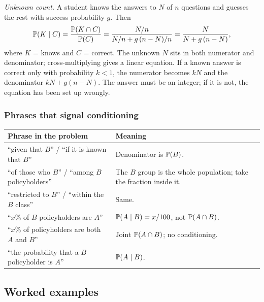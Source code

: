 \emph{Unknown count.} A student knows the answers to $N$ of $n$ questions and
guesses the rest with success probability $g$. Then
\[
\mathbb{P}(K \mid C) = \frac{\mathbb{P}(K \cap C)}{\mathbb{P}(C)}
= \frac{N/n}{N/n + g\,(n - N)/n} = \frac{N}{N + g\,(n - N)} ,
\]
where $K$ = knows and $C$ = correct. The unknown $N$ sits in both numerator and
denominator; cross-multiplying gives a linear equation. If a known answer is
correct only with probability $k < 1$, the numerator becomes $kN$ and the
denominator $kN + g(n - N)$. The answer must be an integer; if it is not, the
equation has been set up wrongly.

\subsubsection*{Phrases that signal conditioning}

\begin{center}
\begin{tabular}{@{}p{}p{}@{}}
\toprule
Phrase in the problem & Meaning \\
\midrule
``given that $B$'' / ``if it is known that $B$'' & Denominator is $\mathbb{P}(B)$. \\
``of those who $B$'' / ``among $B$ policyholders'' & The $B$ group is the whole population; take the fraction inside it. \\
``restricted to $B$'' / ``within the $B$ class'' & Same. \\
``$x$\% of $B$ policyholders are $A$'' & $\mathbb{P}(A \mid B) = x/100$, not $\mathbb{P}(A \cap B)$. \\
``$x$\% of policyholders are both $A$ and $B$'' & Joint $\mathbb{P}(A \cap B)$; no conditioning. \\
``the probability that a $B$ policyholder is $A$'' & $\mathbb{P}(A \mid B)$. \\
\bottomrule
\end{tabular}
\end{center}

\subsection{Worked examples}

